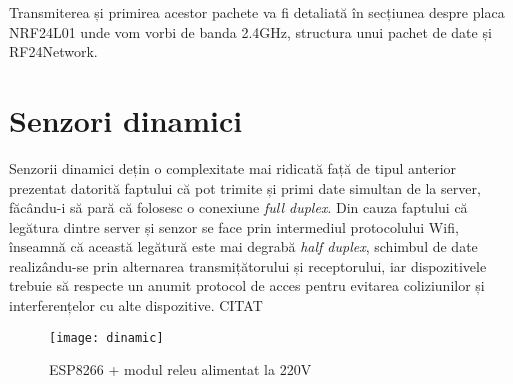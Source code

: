 Transmiterea și primirea acestor pachete va fi detaliată în secțiunea despre placa NRF24L01 unde vom vorbi de banda 2.4GHz, structura unui pachet de date și RF24Network. 

\section{Senzori dinamici}

Senzorii dinamici dețin o complexitate mai ridicată față de tipul anterior prezentat datorită faptului că pot trimite și primi date simultan de la server, făcându-i să pară că folosesc o conexiune \emph{full duplex}. Din cauza faptului că legătura dintre server și senzor se face prin intermediul protocolului Wifi, înseamnă că această legătură este mai degrabă \emph{half duplex}, schimbul de date realizându-se prin alternarea transmițătorului și receptorului, iar dispozitivele trebuie să respecte un anumit protocol de acces pentru evitarea coliziunilor și interferențelor cu alte dispozitive. CITAT

\begin{figure}[h]
	\centering
	\texttt{[image: dinamic]}
	\caption{ESP8266 + modul releu alimentat la 220V}
	\label{fig:dinamic}
\end{figure}